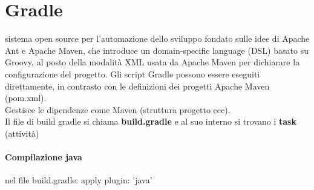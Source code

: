 \documentclass[10pt,a4paper]{book}
\begin{document}
\section{Gradle}
sistema open source per l'automazione dello sviluppo fondato sulle idee di Apache Ant e Apache Maven, che introduce un domain-specific language (DSL) basato su Groovy, al posto della modalità XML usata da Apache Maven per dichiarare la configurazione del progetto. Gli script Gradle possono essere eseguiti direttamente, in contrasto con le definizioni dei progetti Apache Maven (pom.xml).\\
Gestisce le dipendenze come Maven (struttura progetto ecc).\\
Il file di build gradle si chiama \textbf{build.gradle} e al suo interno si trovano i \textbf{task} (attività)

\paragraph{Compilazione java}
nel file build.gradle: apply plugin: 'java'
\end{document}
